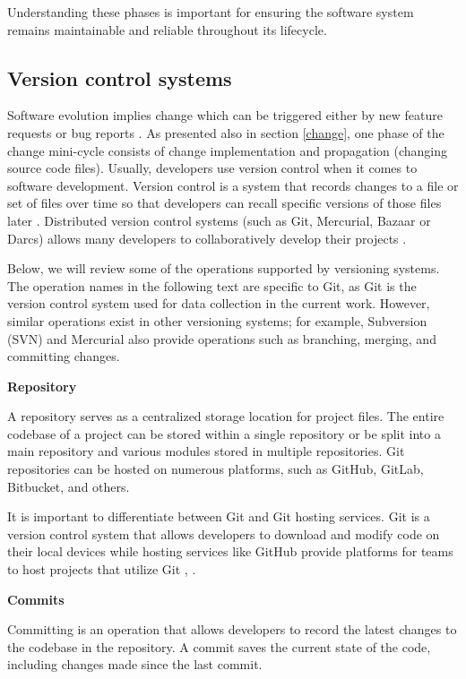 Understanding these phases is important for ensuring the software system remains maintainable and reliable throughout its lifecycle.


\subsection{Version control systems}

\hspace{4em}Software evolution implies change which can be triggered either by new feature requests or bug reports \cite{articleEvolution}. As presented also in section \ref{change}, one phase of the change mini-cycle consists of change implementation and propagation (changing source code files). 
Usually, developers use version control when it comes to software development. Version control is a system that records changes to a file or set of files over time so that developers can recall specific versions of those files later \cite{svn}.
Distributed version control systems (such as Git, Mercurial, Bazaar or Darcs) allows many developers to collaboratively develop their projects \cite{7471284}.

Below, we will review some of the operations supported by versioning systems. The operation names in the following text are specific to Git, as Git is the version control system used for data collection in the current work. However, similar operations exist in other versioning systems; for example, Subversion (SVN) and Mercurial also provide operations such as branching, merging, and committing changes.

\textbf{Repository}

A repository serves as a centralized storage location for project files. The entire codebase of a project can be stored within a single repository or be split into a main repository and various modules stored in multiple repositories. Git repositories can be hosted on numerous platforms, such as GitHub, GitLab, Bitbucket, and others.

It is important to differentiate between Git and Git hosting services. Git is a version control system that allows developers to download and modify code on their local devices while hosting services like GitHub provide platforms for teams to host projects that utilize Git \cite{git}, \cite{github}.

\textbf{Commits}

Committing is an operation that allows developers to record the latest changes to the codebase in the repository. A commit saves the current state of the code, including changes made since the last commit.

